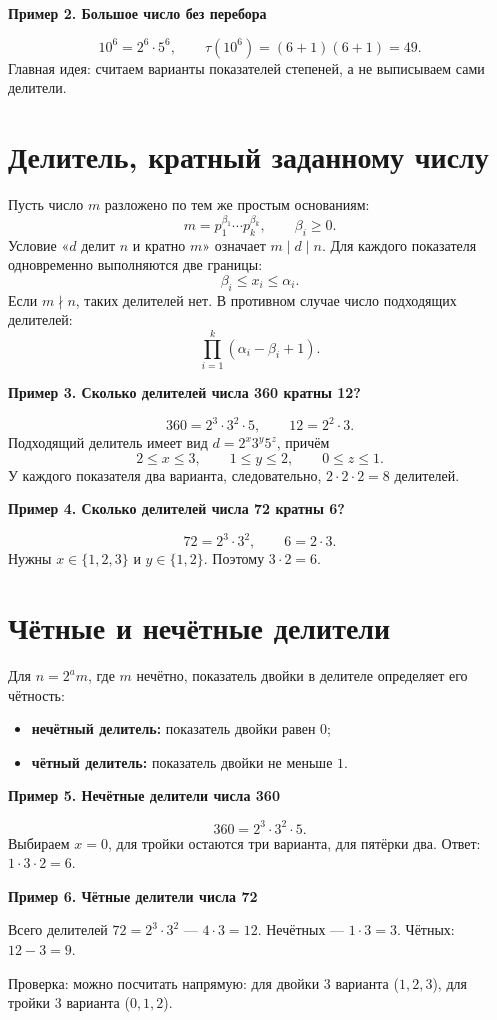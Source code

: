 \documentclass[a4paper,12pt]{article}
\newcommand{\Section}[1]{\vspace{4pt}\section{\textcolor{darkaccent}{#1}}\vspace{-4pt}}
\newcommand{\Key}[1]{\textcolor{darkaccent}{#1}}
\newcommand{\Example}[1]{\par\needspace{6\baselineskip}\medskip\Key{\textbf{#1}}\par\smallskip}
\begin{document}
\Example{Пример 2. Большое число без перебора}
\[
10^6=2^6\cdot5^6,
\qquad \tau(10^6)=(6+1)(6+1)=49.
\]
\Key{Главная идея:} считаем варианты показателей степеней, а не выписываем сами делители.

\Section{Делитель, кратный заданному числу}
Пусть число $m$ разложено по тем же простым основаниям:
\[
m=p_1^{\beta_1}\cdots p_k^{\beta_k},\qquad \beta_i\ge0.
\]
Условие «$d$ делит $n$ и кратно $m$» означает \(m\mid d\mid n\). Для каждого показателя одновременно выполняются две границы:
\[
\boxed{\beta_i\le x_i\le\alpha_i.}
\]
Если $m\nmid n$, таких делителей нет. В противном случае число подходящих делителей:
\[
\boxed{\prod_{i=1}^{k}(\alpha_i-\beta_i+1).}
\]
\Example{Пример 3. Сколько делителей числа 360 кратны 12?}
\[
360=2^3\cdot3^2\cdot5,
\qquad12=2^2\cdot3.
\]
Подходящий делитель имеет вид $d=2^x3^y5^z$, причём
\[
2\le x\le3,\qquad1\le y\le2,\qquad0\le z\le1.
\]
У каждого показателя два варианта, следовательно, \(2\cdot2\cdot2=\boxed{8}\) делителей.

\Example{Пример 4. Сколько делителей числа 72 кратны 6?}
\[
72=2^3\cdot3^2,\qquad6=2\cdot3.
\]
Нужны $x\in\{1,2,3\}$ и $y\in\{1,2\}$. Поэтому \(3\cdot2=\boxed{6}\).

\Section{Чётные и нечётные делители}
Для \(n=2^a m\), где $m$ нечётно, показатель двойки в делителе определяет его чётность:
\begin{itemize}
\item \textbf{нечётный делитель:} показатель двойки равен $0$;
\item \textbf{чётный делитель:} показатель двойки не меньше $1$.
\end{itemize}
\Example{Пример 5. Нечётные делители числа 360}
\[
360=2^3\cdot3^2\cdot5.
\]
Выбираем $x=0$, для тройки остаются три варианта, для пятёрки два. Ответ: \(1\cdot3\cdot2=\boxed{6}\).
\Example{Пример 6. Чётные делители числа 72}
Всего делителей \(72=2^3\cdot3^2\) — $4\cdot3=12$. Нечётных — $1\cdot3=3$. Чётных: \(12-3=\boxed{9}\).\par
\Key{Проверка:} можно посчитать напрямую: для двойки $3$ варианта ($1,2,3$), для тройки $3$ варианта ($0,1,2$).
\end{document}

